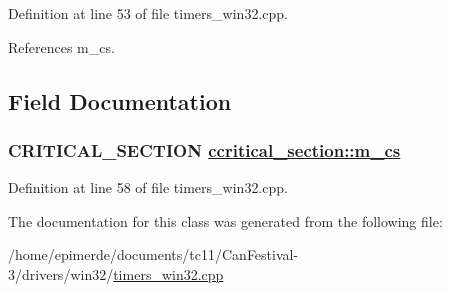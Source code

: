 Definition at line 53 of file timers\_\-win32.cpp.

References m\_\-cs.

\subsection{Field Documentation}
\hypertarget{classccritical__section_102f1ff74ca1adffa1868c3b9d5fb7bb}{
\subsubsection[m\_\-cs]{\setlength{\rightskip}{0pt plus 5cm}CRITICAL\_\-SECTION \hyperlink{classccritical__section_102f1ff74ca1adffa1868c3b9d5fb7bb}{ccritical\_\-section::m\_\-cs}}}
\label{classccritical__section_102f1ff74ca1adffa1868c3b9d5fb7bb}




Definition at line 58 of file timers\_\-win32.cpp.

The documentation for this class was generated from the following file:\begin{CompactItemize}
\item 
/home/epimerde/documents/tc11/Can\-Festival-3/drivers/win32/\hyperlink{timers__win32_8cpp}{timers\_\-win32.cpp}\end{CompactItemize}
